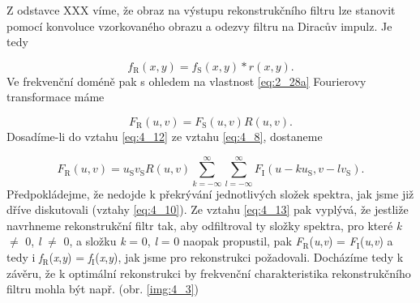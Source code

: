 Z odstavce XXX víme, že obraz na výstupu rekonstrukčního filtru lze stanovit pomocí konvoluce vzorkovaného obrazu a odezvy filtru na Diracův impulz. Je tedy

\begin{equation} \label{eq:4_11}
    f_\mathrm{R}(x, y) = f_\mathrm{S}(x, y) * r(x, y).
\end{equation}
Ve frekvenční doméně pak s ohledem na vlastnost \eqref{eq:2_28a} Fourierovy transformace máme

\begin{equation} \label{eq:4_12}
    F_\mathrm{R}(u, v) = F_\mathrm{S}(u, v) R(u, v).
\end{equation}
Dosadíme-li do vztahu \eqref{eq:4_12} ze vztahu \eqref{eq:4_8}, dostaneme

\begin{equation} \label{eq:4_13}
    F_\mathrm{R}(u, v) = u_\mathrm{S} v_\mathrm{S} R(u, v) \sum\limits_{k=-\infty}^{\infty} \sum\limits_{l=-\infty}^{\infty} F_\mathrm{I} (u - ku_\mathrm{S}, v - lv_\mathrm{S}).
\end{equation}
Předpokládejme, že nedojde k překrývání jednotlivých složek spektra, jak jsme již dříve diskutovali (vztahy \eqref{eq:4_10}). Ze vztahu \eqref{eq:4_13} pak vyplývá, že jestliže navrhneme rekonstrukční filtr tak, aby odfiltroval ty složky spektra, pro které \textit{k} $\neq$ 0, \textit{l} $\neq$ 0, a složku \textit{k} = 0, \textit{l} = 0 naopak propustil, pak \textit{F}$_\mathrm{R}$(\textit{u},\textit{v}) = \textit{F}$_\mathrm{I}$(\textit{u},\textit{v}) a tedy i \textit{f}$_\mathrm{R}$(\textit{x},\textit{y}) = \textit{f}$_\mathrm{I}$(\textit{x},\textit{y}), jak jsme pro rekonstrukci požadovali. Docházíme tedy k závěru, že k optimální rekonstrukci by frekvenční charakteristika rekonstrukčního filtru mohla být např. (obr. \ref{img:4_3})

